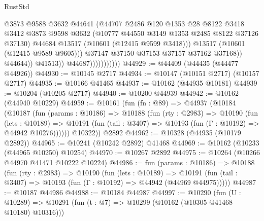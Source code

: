 \begin{lexlean}{RustStd}
\begin{coremodule}
                                        @3873
                                        @9588
                                        @3632
                                        @44641
                                        (@44707
                                          @2486
                                          @120
                                          @1353
                                          @28
                                          @8122
                                          @3418
                                          @3412
                                          @3873
                                          @9598
                                          @3632
                                          (@10777 @44550 @3149 @1353 @2485 @8122 @37126 @37130)
                                          @44684
                                          @13517
                                          (@10601 (@12415 @9599 @3418)))
                                        @13517
                                        (@10601 (@12415 @9589 @9605)))
                                      @37147
                                      @37150
                                      @37153
                                      @37157
                                      @37162
                                      @37168))
                                  @44644))
                              @41513))
                          @44687)))))))))))
@44929 := @44409 (@44435 (@44477 @44926))
@44930 := @10145 @2717
@44934 := @10147 (@10151 @2717) (@10157 @2717)
@44935 := @10166 @41465
@44937 := @10162 (@44935 @10181)
@44939 := @10204 (@10205 @2717)
@44940 := @10200 @44939
@44942 := @10162 (@44940 @10229)
@44959 := @10161
    (fun (fn : @89) =>
    @44937
      (@10184
        (@10187
          (fun (params : @10186) =>
          @10188
            (fun (rty : @2983) =>
            @10190
              (fun (lets : @10189) =>
              @10191 (fun (tail : @3407) => @10193 (fun (Γ : @10192) => @44942 @10276))))))
        @10322))
    @2892
@44962 := @10328 (@44935 (@10179 @2892))
@44965 := @10241 (@10242 @2892) @41468
@44969 := @10162 (@10233 (@44965 @10250) @10254)
@44970 := @10267 @2892
@44975 := @10264 (@10266 @44970 @41471 @10222 @10224)
@44986 := fun (params : @10186) =>
  @10188
    (fun (rty : @2983) =>
    @10190
      (fun (lets : @10189) =>
      @10191 (fun (tail : @3407) => @10193 (fun (Γ : @10192) => @44942 (@44969 @44975)))))
@44987 := @10187 @44986
@44988 := @10184 @44987
@44997 := @10290
    (fun (U : @10289) => @10291 (fun (t : @7) => @10299 (@10162 (@10305 @41468 @10180) @10316)))

\end{coremodule}
\end{lexlean}

